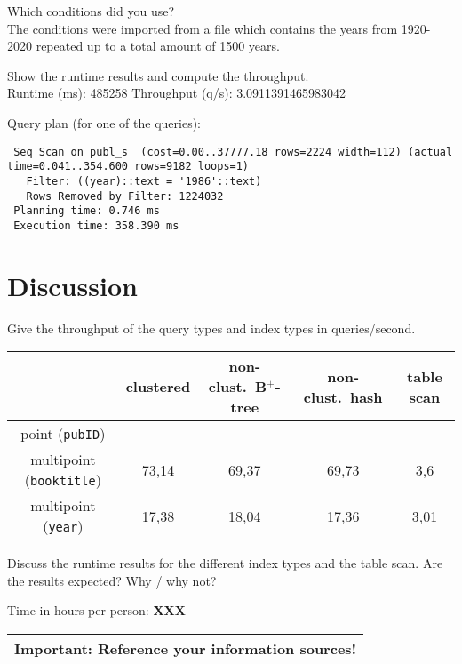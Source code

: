 \documentclass[11pt]{scrartcl}
\begin{document}
\noindent
Which conditions did you use?\\
The conditions were imported from a file which contains the years from 1920-2020 repeated up to a total amount of 1500 years.

\smallskip\noindent
Show the runtime results and compute the throughput.\\
Runtime (ms): 485258
Throughput (q/s): 3.0911391465983042

\smallskip\noindent
Query plan (for one of the queries):
{\small
\begin{verbatim}
 Seq Scan on publ_s  (cost=0.00..37777.18 rows=2224 width=112) (actual time=0.041..354.600 rows=9182 loops=1)
   Filter: ((year)::text = '1986'::text)
   Rows Removed by Filter: 1224032
 Planning time: 0.746 ms
 Execution time: 358.390 ms
\end{verbatim}
}

\section{Discussion}

Give the throughput of the query types and index types in queries/second.
\begin{center}
  \begin{tabular}{c|c|c|c|c}
    & clustered & non-clust.\ B$^+$-tree & non-clust.\ hash & table scan \\
    \hline
    point ({\tt pubID}) & & & \\
    \hline
    multipoint ({\tt booktitle}) & 73,14 & 69,37 & 69,73 & 3,6\\
    \hline
    multipoint  ({\tt year}) & 17,38 & 18,04 & 17,36 & 3,01 \\  
  \end{tabular}
\end{center}

\medskip

Discuss the runtime results for the different index types and the
table scan. Are the results expected? Why / why not?


\bigskip

\noindent Time in hours per person: {\bf XXX}

\bigskip

\begin{center}
  \begin{tabular}{c}
    \hline
    {\bf Important:} Reference your information sources!
    \\\hline
  \end{tabular}
\end{center}
\end{document}
